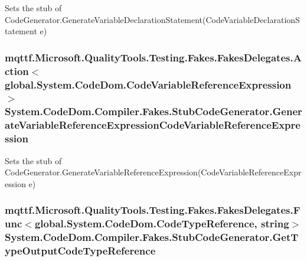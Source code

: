 Sets the stub of Code\-Generator.\-Generate\-Variable\-Declaration\-Statement(\-Code\-Variable\-Declaration\-Statement e)

\hypertarget{class_system_1_1_code_dom_1_1_compiler_1_1_fakes_1_1_stub_code_generator_adcf9cad95c026c501932bd966a553ee0}{
\subsubsection[{Generate\-Variable\-Reference\-Expression\-Code\-Variable\-Reference\-Expression}]{\setlength{\rightskip}{0pt plus 5cm}mqttf.\-Microsoft.\-Quality\-Tools.\-Testing.\-Fakes.\-Fakes\-Delegates.\-Action$<$global.\-System.\-Code\-Dom.\-Code\-Variable\-Reference\-Expression$>$ System.\-Code\-Dom.\-Compiler.\-Fakes.\-Stub\-Code\-Generator.\-Generate\-Variable\-Reference\-Expression\-Code\-Variable\-Reference\-Expression}}\label{class_system_1_1_code_dom_1_1_compiler_1_1_fakes_1_1_stub_code_generator_adcf9cad95c026c501932bd966a553ee0}


Sets the stub of Code\-Generator.\-Generate\-Variable\-Reference\-Expression(\-Code\-Variable\-Reference\-Expression e)

\hypertarget{class_system_1_1_code_dom_1_1_compiler_1_1_fakes_1_1_stub_code_generator_ab797175df57c80a1a4a58281b57f6772}{
\subsubsection[{Get\-Type\-Output\-Code\-Type\-Reference}]{\setlength{\rightskip}{0pt plus 5cm}mqttf.\-Microsoft.\-Quality\-Tools.\-Testing.\-Fakes.\-Fakes\-Delegates.\-Func$<$global.\-System.\-Code\-Dom.\-Code\-Type\-Reference, string$>$ System.\-Code\-Dom.\-Compiler.\-Fakes.\-Stub\-Code\-Generator.\-Get\-Type\-Output\-Code\-Type\-Reference}}\label{class_system_1_1_code_dom_1_1_compiler_1_1_fakes_1_1_stub_code_generator_ab797175df57c80a1a4a58281b57f6772}


